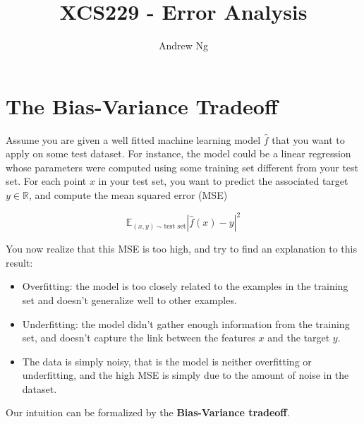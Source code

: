 \documentclass[12pt]{article}
\begin{document}
\title{XCS229 - Error Analysis} 
\author{Andrew Ng}
\date{}
\maketitle


\section{The Bias-Variance Tradeoff}

Assume you are given a well fitted machine learning model $\hat{f}$ that you want to apply on some test dataset. For instance, the model could be a linear regression whose parameters were computed using some training set different from your test set. For each point $x$ in your test set, you want to predict the associated target $y \in \mathbb{R}$, and compute the mean squared error (MSE)

$$\mathbb{E}_{(x,y)\sim \text{test set}} |\hat{f}(x) - y|^2$$

You now realize that this MSE is too high, and try to find an explanation to this result:

\begin{itemize}
	\item Overfitting: the model is too closely related to the examples in the training set and doesn't generalize well to other examples.
	\item Underfitting: the model didn't gather enough information from the training set, and doesn't capture the link between the features $x$ and the target $y$.
	\item The data is simply noisy, that is the model is neither overfitting or underfitting, and the high MSE is simply due to the amount of noise in the dataset.
\end{itemize}

Our intuition can be formalized by the \textbf{Bias-Variance tradeoff}.
\end{document}
